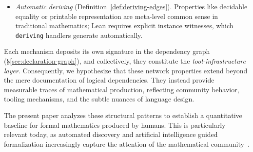 \begin{itemize}
\item \emph{Automatic deriving} (Definition~\ref{def:deriving-edges}). Properties like decidable equality or printable representation are meta-level common sense in traditional mathematics; Lean requires explicit instance witnesses, which \texttt{deriving} handlers generate automatically.
\begin{center}
\end{center}

\end{itemize}
Each mechanism deposits its own signature in the dependency graph (\S\ref{sec:declaration-graph}), and collectively, they constitute the \emph{tool-infrastructure layer}. Consequently, we hypothesize that these network properties extend beyond the mere documentation of logical dependencies. They instead provide measurable traces of mathematical production, reflecting community behavior, tooling mechanisms, and the subtle nuances of language design.

The present paper analyzes these structural patterns to establish a quantitative baseline for formal mathematics produced by humans. This is particularly relevant today, as automated discovery and artificial intelligence guided formalization increasingly capture the attention of the mathematical community~\cite{hubert2025alphaproof,achim2025aristotle,chen2025seedprover,xin2025deepseekprover}. 

